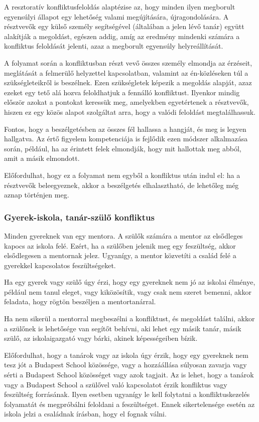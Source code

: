 A resztoratív konfliktusfeloldás alaptézise az, hogy minden ilyen megborult egyensúlyi állapot egy lehetőség valami megújítására, újragondolására. A résztvevők egy külső személy segítségével (általában a jelen lévő tanár) együtt alakítják a megoldást, egészen addig, amíg az eredmény mindenki számára a konfliktus feloldását jelenti, azaz a megborult egyensúly helyreállítását.

A folyamat során a konfliktusban részt vevő összes személy elmondja az érzéseit, meglátását a felmerülő helyzettel kapcsolatban, valamint az én-közléseken túl a szükségleteikről is beszélnek. Ezen szükségletek képezik a megoldás alapját, azaz ezeket egy tető alá hozva feloldhatjuk a fennálló konfliktust. Ilyenkor mindig először azokat a pontokat keressük meg, amelyekben egyetértenek a résztvevők, hiszen ez egy közös alapot szolgáltat arra, hogy a valódi feloldást megtalálhassuk.

Fontos, hogy a beszélgetésben az összes fél hallassa a hangját, és meg is legyen hallgatva. Az értő figyelem kompetenciája is fejlődik ezen módszer alkalmazása során, például, ha az érintett felek elmondják, hogy mit hallottak meg abból, amit a másik elmondott.

Előfordulhat, hogy ez a folyamat nem egyből a konfliktus után indul el: ha a résztvevők beleegyeznek, akkor a beszélgetés elhalasztható, de lehetőleg még aznap történjen meg.

\subsubsection{Gyerek-iskola, tanár-szülő konfliktus}

Minden gyereknek van egy mentora. A szülők számára a mentor az elsődleges kapocs az iskola felé. Ezért, ha a szülőben jelenik meg egy feszültség, akkor elsődlegesen a mentornak jelez. Ugyanígy, a mentor közvetíti a család felé a gyerekkel kapcsolatos feszültségeket.

Ha egy gyerek vagy szülő úgy érzi, hogy egy gyereknek nem jó az iskolai élménye, például nem tanul eleget, vagy kiközösítik, vagy csak nem szeret bemenni, akkor feladata, hogy rögtön beszéljen a mentortanárral.

Ha nem sikerül a mentorral megbeszélni a konfliktust, és megoldást találni, akkor a szülőnek is lehetősége van segítőt behívni, aki lehet egy másik tanár, másik szülő, az iskolaigazgató vagy bárki, akinek képességeiben bízik.\eject

Előfordulhat, hogy a tanárok vagy az iskola úgy érzik, hogy egy gyereknek nem tesz jót a Budapest School közössége, vagy a hozzáállása súlyosan zavarja vagy sérti a Budapest School közösséget vagy azok tagjait. Az is lehet, hogy a tanárok vagy a Budapest School a szülővel való kapcsolatot érzik konfliktus vagy feszültség forrásának. Ilyen esetben ugyanígy le kell folytatni a konfliktuskezelés folyamatát és megpróbálni feloldani a feszültséget. Ennek sikertelensége esetén az iskola jelzi a családnak írásban, hogy el fognak válni.

